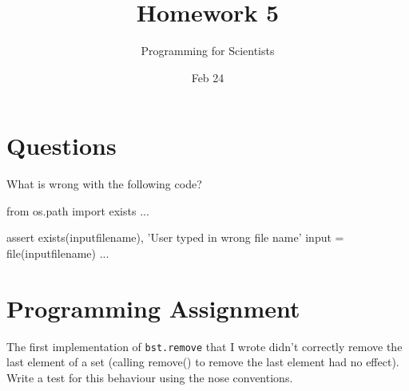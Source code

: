 
\author{Programming for Scientists}
\title{Homework 5}
\date{Feb 24}

\maketitle

\chapter{Questions}

\question %
What is wrong with the following code?

\begin{python}
from os.path import exists
...

assert exists(inputfilename), 'User typed in wrong file name'
input = file(inputfilename)
...
\end{python}

\question %

\question %

\question %

\question %

\chapter{Programming Assignment}
The first implementation of \texttt{bst.remove} that I wrote didn't correctly remove the last element of a set (calling remove() to remove the last element had no effect). Write a test for this behaviour using the nose conventions.


